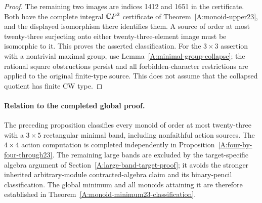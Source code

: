 \begin{proof}
The remaining two images are indices 1412 and 1651 in the
certificate. Both have the complete integral $\mathbb{C}P^2$ certificate
of Theorem~\ref{A:monoid-upper23}, and the displayed isomorphism
there identifies them. A source of order at most twenty-three
surjecting onto either twenty-three-element image must be
isomorphic to it. This proves the asserted classification.
For the $3\times3$ assertion with a nontrivial maximal group,
use Lemma~\ref{A:minimal-group-collapse}; the rational square
obstructions persist and all forbidden-character restrictions
are applied to the original finite-type source. This does not
assume that the collapsed quotient has finite CW type.
\end{proof}

\paragraph{Relation to the completed global proof.}
The preceding proposition classifies every monoid of order at most
twenty-three with a $3\times5$ rectangular minimal band, including
nonfaithful action sources. The $4\times4$ action computation is
completed independently in Proposition~\ref{A:four-by-four-through23}.
The remaining large bands are excluded by the target-specific
algebra argument of Section~\ref{A:large-band-target-proof}; it
avoids the stronger inherited arbitrary-module contracted-algebra
claim and its binary-pencil classification. The global minimum and
all monoids attaining it are therefore established in
Theorem~\ref{A:monoid-minimum23-classification}.
